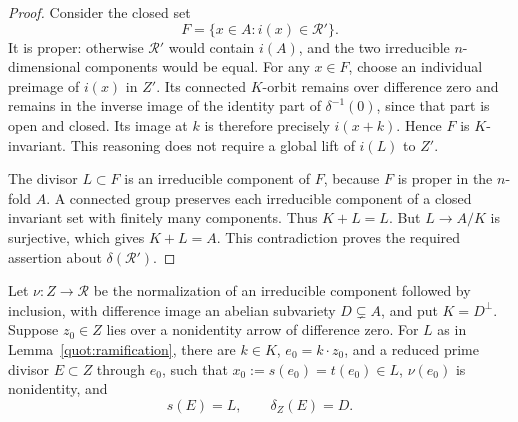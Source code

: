 \begin{proof}
Consider the closed set
\[
                      F=\{x\in A:i(x)\in\mathcal R'\}.
\]
It is proper: otherwise \(\mathcal R'\) would contain \(i(A)\),
and the two irreducible \(n\)-dimensional components would be equal.
For any \(x\in F\), choose an individual preimage of \(i(x)\) in \(Z'\).
Its connected \(K\)-orbit remains over difference zero and remains
in the inverse image of the identity part of \(\delta^{-1}(0)\),
since that part is open and closed.  Its image at \(k\) is therefore
precisely \(i(x+k)\).  Hence \(F\) is \(K\)-invariant.
This reasoning does not require a global lift of \(i(L)\) to \(Z'\).

The divisor \(L\subset F\) is an irreducible component of \(F\),
because \(F\) is proper in the \(n\)-fold \(A\).
A connected group preserves each irreducible component of a closed
invariant set with finitely many components.  Thus \(K+L=L\).
But \(L\to A/K\) is surjective, which gives \(K+L=A\).
This contradiction proves the required assertion about
\(\delta(\mathcal R')\).
\end{proof}

\begin{lemma}
\label{quot:marked-divisor}
Let \(\nu:Z\to\mathcal R\) be the normalization of an irreducible
component followed by inclusion, with difference image an abelian
subvariety \(D\subsetneq A\), and put
\(K=D^\perp\).
Suppose \(z_0\in Z\) lies over a nonidentity arrow of difference zero.
For \(L\) as in Lemma~\ref{quot:ramification}, there are \(k\in K\),
\(e_0=k\cdot z_0\), and a reduced prime divisor \(E\subset Z\)
through \(e_0\), such that \(x_0:=s(e_0)=t(e_0)\in L\),
\(\nu(e_0)\) is nonidentity, and
\[
                         s(E)=L,\qquad \delta_Z(E)=D .
\]
\end{lemma}

